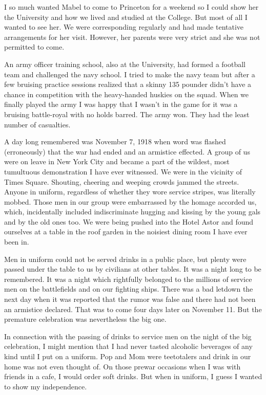 \documentclass[12pt]{book}              %
\begin{document}
I so much wanted Mabel to come to Princeton for a weekend so I could show her the University and how we lived and studied at the College. But most of all I wanted to see her. We were corresponding regularly and had made tentative arrangements for her visit. However, her parents were very strict and she was not permitted to come.

An army officer training school, also at the University, had formed a football team and challenged the navy school. I tried to make the navy team but after a few bruising practice sessions realized that a skinny 135 pounder didn't have a chance in competition with the heavy-handed huskies on the squad. When we finally played the army I was happy that I wasn't in the game for it was a bruising battle-royal with no holds barred. The army won. They had the least number of casualties. 

A day long remembered was November 7, 1918 when word was flashed (erroneously) that the war had ended and an armistice effected. A group of us were on leave in New York City and became a part of the wildest, most tumultuous demonstration I have ever witnessed. We were in the vicinity of Times Square. Shouting, cheering and weeping crowds jammed the streets. Anyone in uniform, regardless of whether they wore service stripes, was literally mobbed. Those men in our group were embarrassed by the homage accorded us, which, incidentally included indiscriminate hugging and kissing by the young gals and by the old ones too. We were being pushed into the Hotel Astor and found ourselves at a table in the roof garden in the noisiest dining room I have ever been in.

Men in uniform could not be served drinks in a public place, but plenty were passed under the table to us by civilians at other tables. It was a night long to be remembered. It was a night which rightfully belonged to the millions of service men on the battlefields and on our fighting ships. There was a bad letdown the next day when it was reported that the rumor was false and there had not been an armistice declared. That was to come four days later on November 11. But the premature celebration was nevertheless the big one. 

In connection with the passing of drinks to service men on the night of the big celebration, I might mention that I had never tasted alcoholic beverages of any kind until I put on a uniform. Pop and Mom were teetotalers and drink in our home was not even thought of. On those prewar occasions when I was with friends in a cafe, I would order soft drinks. But when in uniform, I guess I wanted to show my independence. 
\end{document}
